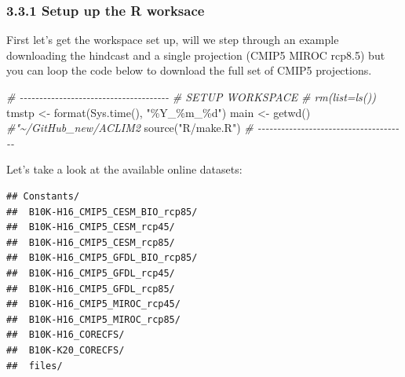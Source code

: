\documentclass[
]{article}
\newenvironment{Shaded}{\begin{snugshade}}{\end{snugshade}}
\newcommand{\AttributeTok}[1]{\textcolor[rgb]{0.77,0.63,0.00}{#1}}
\newcommand{\CommentTok}[1]{\textcolor[rgb]{0.56,0.35,0.01}{\textit{#1}}}
\newcommand{\FunctionTok}[1]{\textcolor[rgb]{0.00,0.00,0.00}{#1}}
\newcommand{\NormalTok}[1]{#1}
\newcommand{\OtherTok}[1]{\textcolor[rgb]{0.56,0.35,0.01}{#1}}
\newcommand{\SpecialCharTok}[1]{\textcolor[rgb]{0.00,0.00,0.00}{#1}}
\newcommand{\StringTok}[1]{\textcolor[rgb]{0.31,0.60,0.02}{#1}}
\begin{document}
\hypertarget{setup-up-the-r-worksace}{%
\subsubsection{3.3.1 Setup up the R
worksace}\label{setup-up-the-r-worksace}}

First let's get the workspace set up, will we step through an example
downloading the hindcast and a single projection (CMIP5 MIROC rcp8.5)
but you can loop the code below to download the full set of CMIP5
projections.

\begin{Shaded}
\begin{Highlighting}[]
    \CommentTok{\# {-}{-}{-}{-}{-}{-}{-}{-}{-}{-}{-}{-}{-}{-}{-}{-}{-}{-}{-}{-}{-}{-}{-}{-}{-}{-}{-}{-}{-}{-}{-}{-}{-}{-}{-}{-}{-}{-}}
    \CommentTok{\# SETUP WORKSPACE}
    \CommentTok{\# rm(list=ls())}
\NormalTok{    tmstp  }\OtherTok{\textless{}{-}} \FunctionTok{format}\NormalTok{(}\FunctionTok{Sys.time}\NormalTok{(), }\StringTok{"\%Y\_\%m\_\%d"}\NormalTok{)}
\NormalTok{    main   }\OtherTok{\textless{}{-}} \FunctionTok{getwd}\NormalTok{()  }\CommentTok{\#"\textasciitilde{}/GitHub\_new/ACLIM2}
    \FunctionTok{source}\NormalTok{(}\StringTok{"R/make.R"}\NormalTok{)}
    \CommentTok{\# {-}{-}{-}{-}{-}{-}{-}{-}{-}{-}{-}{-}{-}{-}{-}{-}{-}{-}{-}{-}{-}{-}{-}{-}{-}{-}{-}{-}{-}{-}{-}{-}{-}{-}{-}{-}{-}{-}}
\end{Highlighting}
\end{Shaded}

Let's take a look at the available online datasets:

\begin{Shaded}
\end{Shaded}

\begin{verbatim}
## Constants/ 
##  B10K-H16_CMIP5_CESM_BIO_rcp85/ 
##  B10K-H16_CMIP5_CESM_rcp45/ 
##  B10K-H16_CMIP5_CESM_rcp85/ 
##  B10K-H16_CMIP5_GFDL_BIO_rcp85/ 
##  B10K-H16_CMIP5_GFDL_rcp45/ 
##  B10K-H16_CMIP5_GFDL_rcp85/ 
##  B10K-H16_CMIP5_MIROC_rcp45/ 
##  B10K-H16_CMIP5_MIROC_rcp85/ 
##  B10K-H16_CORECFS/ 
##  B10K-K20_CORECFS/ 
##  files/
\end{verbatim}
\end{document}

